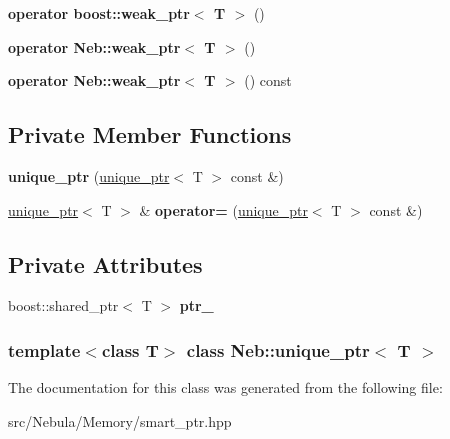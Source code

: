 \begin{DoxyCompactItemize}
\item 
\hypertarget{classNeb_1_1unique__ptr_a1b178172f5769aff9f266ff845158a09}{{\bfseries operator boost\-::weak\-\_\-ptr$<$ T $>$} ()}\label{classNeb_1_1unique__ptr_a1b178172f5769aff9f266ff845158a09}

\item 
\hypertarget{classNeb_1_1unique__ptr_a6e2cd02db8e6e2a088a4c65733833bc0}{{\bfseries operator Neb\-::weak\-\_\-ptr$<$ T $>$} ()}\label{classNeb_1_1unique__ptr_a6e2cd02db8e6e2a088a4c65733833bc0}

\item 
\hypertarget{classNeb_1_1unique__ptr_ae9d9221fa91351daa793e30fc5105620}{{\bfseries operator Neb\-::weak\-\_\-ptr$<$ T $>$} () const }\label{classNeb_1_1unique__ptr_ae9d9221fa91351daa793e30fc5105620}

\end{DoxyCompactItemize}
\subsection*{\-Private \-Member \-Functions}
\begin{DoxyCompactItemize}
\item 
\hypertarget{classNeb_1_1unique__ptr_a79585a3cbcbe213f1a950ecf323691a5}{{\bfseries unique\-\_\-ptr} (\hyperlink{classNeb_1_1unique__ptr}{unique\-\_\-ptr}$<$ \-T $>$ const \&)}\label{classNeb_1_1unique__ptr_a79585a3cbcbe213f1a950ecf323691a5}

\item 
\hypertarget{classNeb_1_1unique__ptr_a8f3c0a31ca5f804867993a1203b31ba6}{\hyperlink{classNeb_1_1unique__ptr}{unique\-\_\-ptr}$<$ \-T $>$ \& {\bfseries operator=} (\hyperlink{classNeb_1_1unique__ptr}{unique\-\_\-ptr}$<$ \-T $>$ const \&)}\label{classNeb_1_1unique__ptr_a8f3c0a31ca5f804867993a1203b31ba6}

\end{DoxyCompactItemize}
\subsection*{\-Private \-Attributes}
\begin{DoxyCompactItemize}
\item 
\hypertarget{classNeb_1_1unique__ptr_aea69c28abf555c29636c736c142c9b2e}{boost\-::shared\-\_\-ptr$<$ \-T $>$ {\bfseries ptr\-\_\-}}\label{classNeb_1_1unique__ptr_aea69c28abf555c29636c736c142c9b2e}

\end{DoxyCompactItemize}
\subsubsection*{template$<$class \-T$>$ class Neb\-::unique\-\_\-ptr$<$ T $>$}



\-The documentation for this class was generated from the following file\-:\begin{DoxyCompactItemize}
\item 
src/\-Nebula/\-Memory/smart\-\_\-ptr.\-hpp\end{DoxyCompactItemize}
